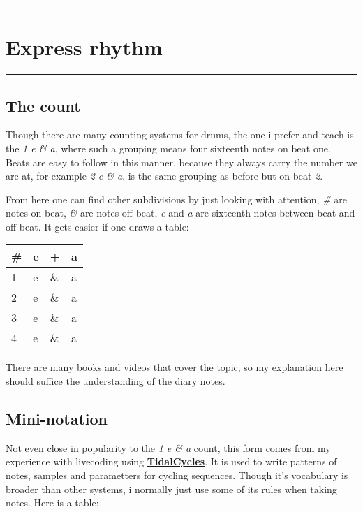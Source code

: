 \documentclass[
]{book}
\begin{document}
\begin{center}\rule{0.5\linewidth}{0.5pt}\end{center}

\hypertarget{Express-rhythm}{%
\chapter{Express rhythm}\label{Express-rhythm}}

\begin{center}\rule{0.5\linewidth}{0.5pt}\end{center}

\hypertarget{the-count}{%
\section*{The count}\label{the-count}}

Though there are many counting systems for drums, the one i prefer and teach is the \emph{1 e \& a}, where such a grouping means four sixteenth notes on beat one. Beats are easy to follow in this manner, because they always carry the number we are at, for example \emph{2 e \& a}, is the same grouping as before but on beat \emph{2}.

From here one can find other subdivisions by just looking with attention, \emph{\#} are notes on beat, \emph{\&} are notes off-beat, \emph{e} and \emph{a} are sixteenth notes between beat and off-beat. It gets easier if one draws a table:

\begin{longtable}[]{@{}llll@{}}
\toprule
\# & e & + & a \\
\midrule
\endhead
1 & e & \& & a \\
2 & e & \& & a \\
3 & e & \& & a \\
4 & e & \& & a \\
\bottomrule
\end{longtable}

There are many books and videos that cover the topic, so my explanation here should suffice the understanding of the diary notes.

\hypertarget{mini-notation}{%
\section*{Mini-notation}\label{mini-notation}}

Not even close in popularity to the \emph{1 e \& a} count, this form comes from my experience with livecoding using \textbf{\href{https://tidalcycles.org/}{TidalCycles}}. It is used to write patterns of notes, samples and parametters for cycling sequences. Though it's vocabulary is broader than other systems, i normally just use some of its rules when taking notes. Here is a table:
\end{document}
